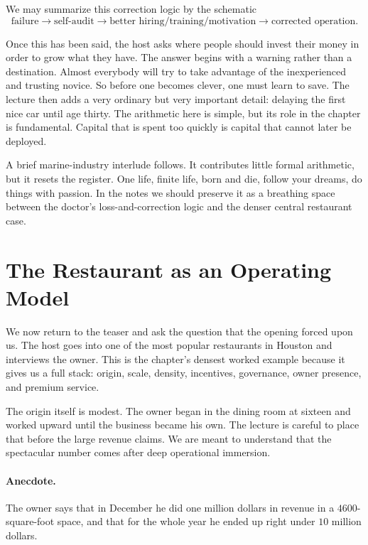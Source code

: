 We may summarize this correction logic by the schematic
\begin{equation}
\text{failure}
\longrightarrow
\text{self-audit}
\longrightarrow
\text{better hiring/training/motivation}
\longrightarrow
\text{corrected operation}.
\end{equation}

Once this has been said, the host asks where people should invest their money in order to grow what they have. The answer begins with a warning rather than a destination. Almost everybody will try to take advantage of the inexperienced and trusting novice. So before one becomes clever, one must learn to save. The lecture then adds a very ordinary but very important detail: delaying the first nice car until age thirty. The arithmetic here is simple, but its role in the chapter is fundamental. Capital that is spent too quickly is capital that cannot later be deployed.

A brief marine-industry interlude follows. It contributes little formal arithmetic, but it resets the register. One life, finite life, born and die, follow your dreams, do things with passion. In the notes we should preserve it as a breathing space between the doctor's loss-and-correction logic and the denser central restaurant case.

\section{The Restaurant as an Operating Model}

We now return to the teaser and ask the question that the opening forced upon us. The host goes into one of the most popular restaurants in Houston and interviews the owner. This is the chapter's densest worked example because it gives us a full stack: origin, scale, density, incentives, governance, owner presence, and premium service.

The origin itself is modest. The owner began in the dining room at sixteen and worked upward until the business became his own. The lecture is careful to place that before the large revenue claims. We are meant to understand that the spectacular number comes after deep operational immersion.

\paragraph{Anecdote.} The owner says that in December he did one million dollars in revenue in a \(4600\)-square-foot space, and that for the whole year he ended up right under \(10\) million dollars.

